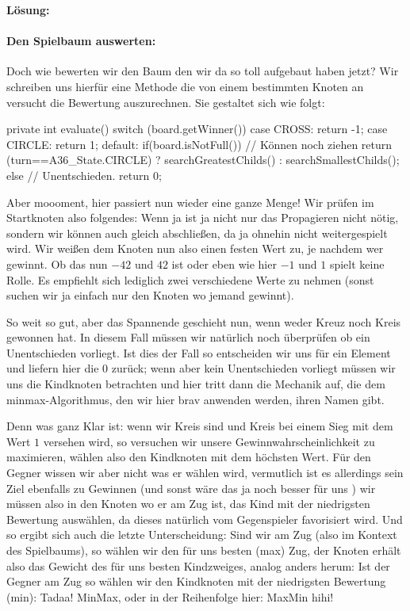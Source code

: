 \documentclass[table]{sopra-base}
\makeatletter
\newenvironment{solution}{\null\par\noindent\textbf{\textcolor{sob@col@uulm@cs}{Lösung:}}\newline\bgroup\color{black}\slshape\ignorespaces}{\egroup}
\makeatother
\begin{document}
\begin{solution}
\paragraph{Den Spielbaum auswerten:}
Doch wie bewerten wir den Baum den wir da so toll aufgebaut haben jetzt? Wir schreiben uns hierfür eine Methode  die von einem bestimmten Knoten an versucht die Bewertung auszurechnen. Sie gestaltet sich wie folgt:
\begin{java}
private int evaluate(){
    switch (board.getWinner()){
        case CROSS: return -1;
        case CIRCLE: return 1;
        default:
            if(board.isNotFull()) // Können noch ziehen
                return (turn==A36_State.CIRCLE) ?
                            searchGreatestChilds() :
                            searchSmallestChilds();
            else // Unentschieden.
                return 0;
    }
}
\end{java}
Aber moooment, hier passiert nun wieder eine ganze Menge! Wir prüfen im Startknoten also folgendes:  Wenn ja ist ja nicht nur das Propagieren nicht nötig, sondern wir können auch gleich abschließen, da ja ohnehin nicht weitergespielt wird. Wir weißen dem Knoten nun also einen festen Wert zu, je nachdem wer gewinnt. Ob das nun \(-42\) und \(42\) ist oder eben wie hier \(-1\) und \(1\) spielt keine Rolle. Es empfiehlt sich lediglich zwei verschiedene Werte zu nehmen (sonst suchen wir ja einfach nur den Knoten wo jemand gewinnt).\par{}
So weit so gut, aber das Spannende geschieht nun, wenn weder Kreuz noch Kreis gewonnen hat. In diesem Fall müssen
wir natürlich noch überprüfen ob ein Unentschieden vorliegt. Ist dies der Fall so entscheiden wir uns für ein  Element und liefern hier die \(0\) zurück; wenn aber kein Unentschieden vorliegt müssen wir uns die Kindknoten betrachten und hier tritt dann die Mechanik auf, die dem minmax-Algorithmus, den wir hier brav anwenden werden, ihren Namen gibt.\par{}
Denn was ganz Klar ist: wenn wir Kreis sind und Kreis bei einem Sieg mit dem Wert \(1\) versehen wird, so versuchen wir unsere Gewinnwahrscheinlichkeit zu maximieren, wählen also den Kindknoten mit dem höchsten Wert. Für den Gegner wissen wir aber nicht was er wählen wird, vermutlich ist es allerdings sein Ziel ebenfalls zu Gewinnen (und sonst wäre das ja noch besser für uns \Laughey) wir müssen also in den Knoten wo er am Zug ist, das Kind mit der niedrigsten Bewertung auswählen, da dieses natürlich vom Gegenspieler favorisiert wird. Und so ergibt sich auch die letzte Unterscheidung: Sind wir am Zug (also im Kontext des Spielbaums), so wählen wir den für uns besten (max) Zug, der Knoten erhält also das Gewicht des für uns besten Kindzweiges, analog anders herum: Ist der Gegner am Zug so wählen wir den Kindknoten mit der niedrigsten Bewertung (min): Tadaa! MinMax, oder in der Reihenfolge hier: MaxMin hihi\Laughey!\par{}

\end{solution}
\end{document}
